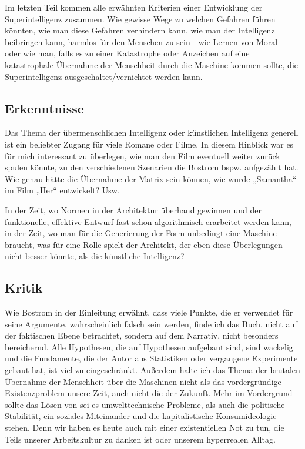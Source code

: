 \documentclass[twoside, a4paper, DIV=11, open=any, bibliography=totoc]{scrbook}
\begin{document}
Im letzten Teil kommen alle erwähnten Kriterien einer Entwicklung der Superintelligenz zusammen. Wie gewisse Wege zu welchen Gefahren führen könnten, wie man diese Gefahren verhindern kann, wie man der Intelligenz beibringen kann, harmlos für den Menschen zu sein - wie Lernen von Moral - oder wie man, falls es zu einer Katastrophe oder Anzeichen auf eine katastrophale Übernahme der Menschheit durch die Maschine kommen sollte, die Superintelligenz ausgeschaltet/vernichtet werden kann.

\subsection{Erkenntnisse} \label{sec:literkenntnis1}

Das Thema der übermenschlichen Intelligenz oder künstlichen Intelligenz generell ist ein beliebter Zugang für viele Romane oder Filme. In diesem Hinblick war es für mich interessant zu überlegen, wie man den Film eventuell weiter zurück spulen könnte, zu den verschiedenen Szenarien die Bostrom bspw. aufgezählt hat. Wie genau hätte die Übernahme der Matrix sein können, wie wurde „Samantha“ im Film „Her“ entwickelt? Usw. 

In der Zeit, wo Normen in der Architektur überhand gewinnen und der funktionelle, effektive Entwurf fast schon algorithmisch erarbeitet werden kann, in der Zeit, wo man für die Generierung der Form unbedingt eine Maschine braucht, was für eine Rolle spielt der Architekt, der eben diese Überlegungen nicht besser könnte, als die künstliche Intelligenz? 

\subsection{Kritik} \label{sec:litkritik1}

Wie Bostrom in der Einleitung erwähnt, dass viele Punkte, die er verwendet für seine Argumente, wahrscheinlich falsch sein werden, finde ich das Buch, nicht auf der faktischen Ebene betrachtet, sondern auf dem Narrativ, nicht besonders bereichernd. Alle Hypothesen, die auf Hypothesen aufgebaut sind, sind wackelig und die Fundamente, die der Autor aus Statistiken oder vergangene Experimente gebaut hat, ist viel zu eingeschränkt. Außerdem halte ich das Thema der brutalen Übernahme der Menschheit über die Maschinen nicht als das vordergründige Existenzproblem unsere Zeit, auch nicht die der Zukunft. Mehr im Vordergrund sollte das Lösen von sei es umwelttechnische Probleme, als auch die politische Stabilität, ein soziales Miteinander und die kapitalistische Konsumideologie stehen. Denn wir haben es heute auch mit einer existentiellen Not zu tun, die Teils unserer Arbeitskultur zu danken ist oder unserem hyperrealen Alltag. 
\end{document}
